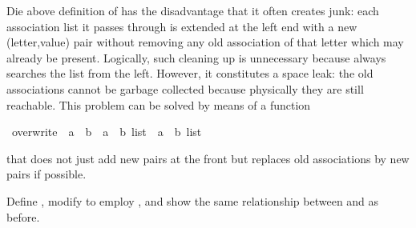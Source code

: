 %
\begin{isabellebody}%
\def\isabellecontext{Trie{\isadigit{2}}}%
\isamarkupfalse%
%
\begin{isamarkuptext}%
Die above definition of  has the disadvantage
that it often creates junk: each association list it passes through is
extended at the left end with a new (letter,value) pair without
removing any old association of that letter which may already be
present.  Logically, such cleaning up is unnecessary because  always searches the list from the left. However, it constitutes
a space leak: the old associations cannot be garbage collected because
physically they are still reachable. This problem can be solved by
means of a function%
\end{isamarkuptext}%
\isamarkuptrue%
\ overwrite\ {\isacharcolon}{\isacharcolon}\ {\isachardoublequote}{\isacharprime}a\ {\isasymRightarrow}\ {\isacharprime}b\ {\isasymRightarrow}\ {\isacharparenleft}{\isacharprime}a\ {\isacharasterisk}\ {\isacharprime}b{\isacharparenright}\ list\ {\isasymRightarrow}\ {\isacharparenleft}{\isacharprime}a\ {\isacharasterisk}\ {\isacharprime}b{\isacharparenright}\ list{\isachardoublequote}\isamarkupfalse%
%
\begin{isamarkuptext}%
that does not just add new pairs at the front but replaces old
associations by new pairs if possible.

Define , modify  to employ , and show the same relationship between  and
 as before.%
\end{isamarkuptext}%
\isamarkuptrue%
\isamarkupfalse%
\end{isabellebody}%
